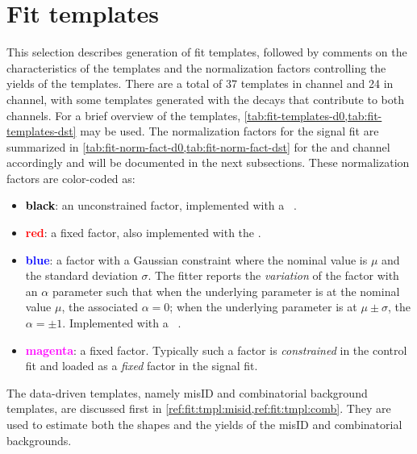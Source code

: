 \section{Fit templates}
\label{ref:fit:tmpl}

This selection describes generation of fit templates,
followed by comments on the characteristics of the templates and the
normalization factors controlling the yields of the templates.
There are a total of 37 templates in \Dz channel and 24 in \Dstar channel,
with some templates generated with the decays that contribute to both
channels.
For a brief overview of the templates,
\cref{tab:fit-templates-d0,tab:fit-templates-dst} may be used.
The normalization factors for the signal fit are summarized in
\cref{tab:fit-norm-fact-d0,tab:fit-norm-fact-dst} for the \Dz and \Dstar channel
accordingly and will be documented in the next subsections.
These normalization factors are color-coded as:
\begin{itemize}
    \item \textbf{\textcolor{black}{black}}:
        an unconstrained factor,
        implemented with a \HistFactory\ .
    \item \textbf{\textcolor{red}{red}}:
        a fixed factor,
        also implemented with the .
    \item \textbf{\textcolor{blue}{blue}}:
        a factor with a Gaussian constraint
        where the nominal value is $\mu$ and the standard deviation $\sigma$.
        The fitter reports the \emph{variation} of the factor with an $\alpha$
        parameter such that when the underlying parameter is at the nominal
        value $\mu$, the associated $\alpha = 0$;
        when the underlying parameter is at $\mu \pm \sigma$, the $\alpha = \pm 1$.
        Implemented with a \HistFactory\ .
    \item \textbf{\textcolor{magenta}{magenta}}:
        a fixed  factor.
        Typically such a factor is \emph{constrained} in the control fit and
        loaded as a \emph{fixed} factor in the signal fit.
\end{itemize}





The data-driven templates,
namely \muon misID and combinatorial background templates,
are discussed first in \cref{ref:fit:tmpl:misid,ref:fit:tmpl:comb}.
They are used to estimate both the shapes and the yields of the misID and
combinatorial backgrounds.

